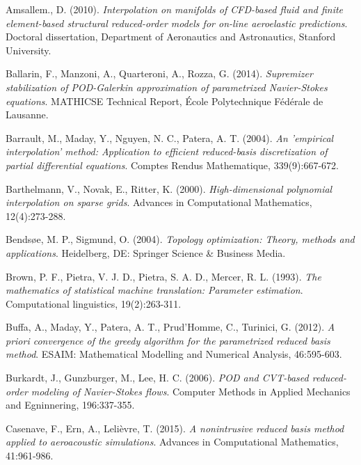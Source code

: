 \documentclass[12pt, a4paper, twoside, openright, notitlepage]{report}
\numberwithin{equation}{chapter}
\theoremstyle{theorem}
\theoremstyle{definition}
\theoremstyle{remark}
\theoremstyle{proposition}
\numberwithin{figure}{chapter}
\begin{document}
	\begin{thebibliography}{50}
	
		\vspace*{-0.1cm}
	
		Amsallem., D. (2010). \emph{Interpolation on manifolds of CFD-based fluid and finite element-based structural reduced-order models for on-line aeroelastic predictions}. Doctoral dissertation, Department of Aeronautics and Astronautics, Stanford University.
		
		Ballarin, F., Manzoni, A., Quarteroni, A., Rozza, G. (2014). \emph{Supremizer stabilization of POD-Galerkin approximation of parametrized Navier-Stokes equations}. MATHICSE Technical Report, \'Ecole Polytechnique F\'ed\'erale de Lausanne.
	
		Barrault, M., Maday, Y., Nguyen, N. C., Patera, A. T. (2004). \emph{An 'empirical interpolation' method: Application to efficient reduced-basis discretization of partial differential equations}. Comptes Rendus Mathematique, 339(9):667-672.
		
		Barthelmann, V., Novak, E., Ritter, K. (2000). \emph{High-dimensional polynomial interpolation on sparse grids}. Advances in Computational Mathematics, 12(4):273-288.
		
		Bends\o{}e, M. P., Sigmund, O. (2004). \emph{Topology optimization: Theory, methods and applications}. Heidelberg, DE: Springer Science \& Business Media. 
		
		Brown, P. F., Pietra, V. J. D., Pietra, S. A. D., Mercer, R. L. (1993). \emph{The mathematics of statistical machine translation: Parameter estimation}. Computational linguistics, 19(2):263-311.
		
		Buffa, A., Maday, Y., Patera, A. T., Prud'Homme, C., Turinici, G. (2012). \emph{A priori convergence of the greedy algorithm for the parametrized reduced basis method}. ESAIM: Mathematical Modelling and Numerical Analysis, 46:595-603.
		
		Burkardt, J., Gunzburger, M., Lee, H. C. (2006). \emph{POD and CVT-based reduced-order modeling of Navier-Stokes flows}. Computer Methods in Applied Mechanics and Egninnering, 196:337-355.
		
		Casenave, F., Ern, A., Lelièvre, T. (2015). \emph{A nonintrusive reduced basis method applied to aeroacoustic simulations}. Advances in Computational Mathematics, 41:961-986.
		

\end{thebibliography}
\end{document}

